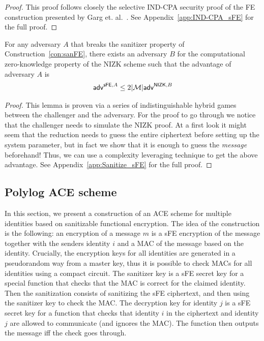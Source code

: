 \documentclass{llncs}
\begin{document}
\begin{proof}
This proof follows closely the selective IND-CPA security proof of the FE construction presented by Garg et. al.~\cite{DBLP:conf/focs/GargGH0SW13}.
See Appendix~\ref{app:IND-CPA_sFE} for the full proof.
\end{proof}

\begin{lem}\label{lem:Sanitize_sFE}
For any adversary $A$ that breaks the sanitizer property of Construction~\ref{con:sanFE}, there exists an adversary $B$ for the computational zero-knowledge property of the NIZK scheme such that the advantage of adversary $A$ is
\begin{align*}
	\mathsf{adv}^{\mathsf{sFE},A} \leq 2|\mathcal{M}| \mathsf{adv}^{\mathsf{NIZK},B} 
\end{align*}
\end{lem}


\begin{proof}
This lemma is proven via a series of indistinguishable hybrid games between the challenger and the adversary. For the proof to go through we notice that the challenger needs to simulate the NIZK proof. At a first look it might seem that the reduction needs to guess the entire ciphertext before setting up the system parameter, but in fact we show that it is enough to guess the \emph{message} beforehand! Thus, we can use a complexity leveraging technique to get the above advantage.
See Appendix~\ref{app:Sanitize_sFE} for the full proof.

\end{proof}



\subsection{Polylog ACE scheme}\label{sec:polylogace}

In this section, we present a construction of an ACE scheme for multiple identities based on sanitizable functional encryption. The idea of the construction is the following: an encryption of a message $m$ is a sFE encryption of the message together with the senders identity $i$ and a MAC of the message based on the identity. Crucially, the encryption keys for all identities are generated in a pseudorandom way from a master key, thus it is possible to check MACs for all identities using a compact circuit.
The sanitizer key is a sFE secret key for a special function that checks that the MAC is correct for the claimed identity. 
Then the sanitization consists of sanitizing the sFE ciphertext, and then using the sanitizer key to check the MAC.
The decryption key for identity $j$ is a sFE secret key for a function that checks that identity $i$ in the ciphertext and identity $j$ are allowed to communicate (and ignores the MAC). The function then outputs the message iff the check goes through.
\end{document}
